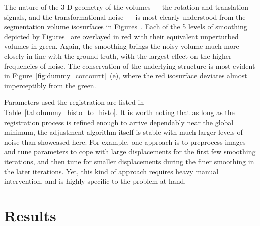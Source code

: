   The nature of the 3-D geometry of the volumes --- the rotation and translation signals, and the transformational noise --- is most clearly understood from the segmentation volume isosurfaces in Figures~. Each of the 5 levels of smoothing depicted by Figures~ are overlayed in red with their equivalent unperturbed volumes in green. Again, the smoothing brings the noisy volume much more closely in line with the ground truth, with the largest effect on the higher frequencies of noise. The conservation of the underlying structure is most evident in Figure~\ref{fig:dummy_contourrt}~(e), where the red isosurface deviates almost imperceptibly from the green.
  
  Parameters used the registration are listed in Table~\ref{tab:dummy_histo_to_histo}. It is worth noting that as long as the registration process is refined enough to arrive dependably near the global minimum, the adjustment algorithm itself is stable with much larger levels of noise than showcased here. For example, one approach is to preprocess images and tune parameters to cope with large displacements for the first few smoothing iterations, and then tune for smaller displacements during the finer smoothing in the later iterations. Yet, this kind of approach requires heavy manual intervention, and is highly specific to the problem at hand.

\section{Results} %
\label{sec:results}
